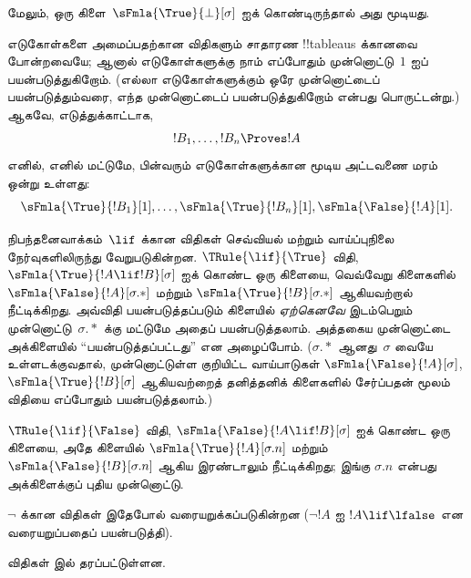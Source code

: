 \documentclass[../../../include/open-logic-section]{subfiles}
\begin{document}
மேலும், ஒரு கிளை~$\sFmla{\True}{\bot}[\sigma]$ ஐக் கொண்டிருந்தால் அது
மூடியது.

எடுகோள்களை அமைப்பதற்கான விதிகளும் சாதாரண !!{tableau}s க்கானவை போன்றவையே;
ஆனால் எடுகோள்களுக்கு நாம் எப்போதும் முன்னொட்டு~$1$ ஐப் பயன்படுத்துகிறோம்.
(எல்லா எடுகோள்களுக்கும் ஒரே முன்னொட்டைப் பயன்படுத்தும்வரை, எந்த
முன்னொட்டைப் பயன்படுத்துகிறோம் என்பது பொருட்டன்று.) ஆகவே, எடுத்துக்காட்டாக,
\[
!B_1, \dots, !B_n \Proves !A
\]
எனில், எனில் மட்டுமே, பின்வரும் எடுகோள்களுக்கான மூடிய அட்டவணை மரம் ஒன்று
உள்ளது:
\[
\sFmla{\True}{!B_1}[1], \dots, \sFmla{\True}{!B_n}[1],
\sFmla{\False}{!A}[1].
\]

நிபந்தனைவாக்கம்~$\lif$ க்கான விதிகள் செவ்வியல் மற்றும் வாய்ப்புநிலை
நேர்வுகளிலிருந்து வேறுபடுகின்றன. $\TRule{\lif}{\True}$ விதி,
$\sFmla{\True}{!A \lif !B}[\sigma]$ ஐக் கொண்ட ஒரு கிளையை, வெவ்வேறு
கிளைகளில் $\sFmla{\False}{!A}[\sigma.{*}]$ மற்றும்
$\sFmla{\True}{!B}[\sigma.{*}]$ ஆகியவற்றால் நீட்டிக்கிறது.
அவ்விதி பயன்படுத்தப்படும் கிளையில் \emph{ஏற்கெனவே} இடம்பெறும்
முன்னொட்டு~$\sigma.{*}$ க்கு மட்டுமே அதைப் பயன்படுத்தலாம். அத்தகைய
முன்னொட்டை அக்கிளையில் ``பயன்படுத்தப்பட்டது'' என அழைப்போம்.
($\sigma.{*}$ ஆனது~$\sigma$ வையே உள்ளடக்குவதால், முன்னொட்டுள்ள குறியிட்ட
வாய்பாடுகள் $\sFmla{\False}{!A}[\sigma]$, $\sFmla{\True}{!B}[\sigma]$
ஆகியவற்றைத் தனித்தனிக் கிளைகளில் சேர்ப்பதன் மூலம் விதியை எப்போதும்
பயன்படுத்தலாம்.)

$\TRule{\lif}{\False}$ விதி, $\sFmla{\False}{!A \lif !B}[\sigma]$ ஐக்
கொண்ட ஒரு கிளையை, அதே கிளையில் $\sFmla{\True}{!A}[\sigma.n]$ மற்றும்
$\sFmla{\False}{!B}[\sigma.n]$ ஆகிய இரண்டாலும் நீட்டிக்கிறது; இங்கு
$\sigma.n$ என்பது அக்கிளைக்குப் புதிய முன்னொட்டு.

$\lnot$ க்கான விதிகள் இதேபோல் வரையறுக்கப்படுகின்றன ($\lnot !A$ ஐ
$!A \lif \lfalse$ என வரையறுப்பதைப் பயன்படுத்தி).

விதிகள்  இல் தரப்பட்டுள்ளன.
\end{document}
